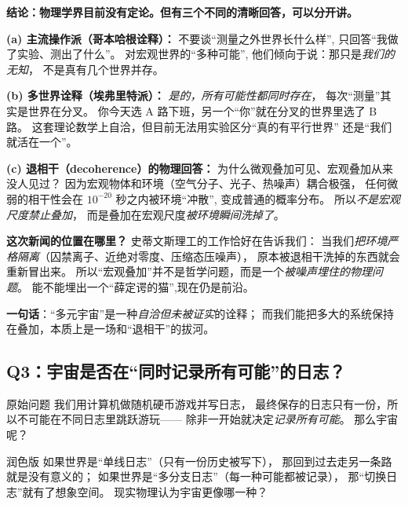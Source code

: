 \documentclass[11pt,a4paper]{ctexart}
\begin{document}
\begin{answerblock}
\textbf{结论：物理学界目前没有定论。但有三个不同的清晰回答，可以分开讲。}

\smallskip
\textbf{(a) 主流操作派（哥本哈根诠释）：}
不要谈``测量之外世界长什么样'',
只回答``我做了实验、测出了什么''。
对宏观世界的``多种可能'',
他们倾向于说：那只是\emph{我们的无知}，
不是真有几个世界并存。

\smallskip
\textbf{(b) 多世界诠释（埃弗里特派）：}
\emph{是的，所有可能性都同时存在}，
每次``测量''其实是世界在分叉。
你今天选 A 路下班，另一个``你''就在分叉的世界里选了 B 路。
这套理论数学上自洽，但目前无法用实验区分``真的有平行世界''
还是``我们就活在一个''。

\smallskip
\textbf{(c) 退相干（decoherence）的物理回答：}
为什么微观叠加可见、宏观叠加从来没人见过？
因为宏观物体和环境（空气分子、光子、热噪声）耦合极强，
任何微弱的相干性会在 $10^{-20}$ 秒之内被环境``冲散'',
变成普通的概率分布。
所以\emph{不是宏观尺度禁止叠加}，
而是叠加在宏观尺度\emph{被环境瞬间洗掉了}。

\smallskip
\textbf{这次新闻的位置在哪里？}
史蒂文斯理工的工作恰好在告诉我们：
当我们\emph{把环境严格隔离}（囚禁离子、近绝对零度、压缩态压噪声），
原本被退相干洗掉的东西就会重新冒出来。
所以``宏观叠加''并不是哲学问题，而是一个\emph{被噪声埋住的物理问题}。
能不能埋出一个``薛定谔的猫'',现在仍是前沿。

\smallskip
\textbf{一句话}：``多元宇宙''是一种\emph{自洽但未被证实}的诠释；
而我们能把多大的系统保持在叠加，本质上是一场和``退相干''的拔河。
\end{answerblock}

\subsection{Q3：宇宙是否在``同时记录所有可能''的日志？}

\begin{questionblock}{原始问题}
我们用计算机做随机硬币游戏并写日志，
最终保存的日志只有一份，所以不可能在不同日志里跳跃游玩——
除非一开始就决定\emph{记录所有可能}。
那么宇宙呢？
\end{questionblock}

\begin{questionblock}{润色版}
如果世界是``单线日志''（只有一份历史被写下），
那回到过去走另一条路就是没有意义的；
如果世界是``多分支日志''（每一种可能都被记录），
那``切换日志''就有了想象空间。
现实物理认为宇宙更像哪一种？
\end{questionblock}
\end{document}
